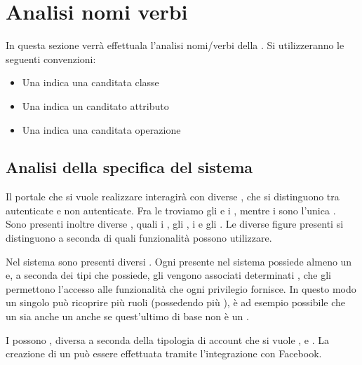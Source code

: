%


\section{Analisi nomi verbi} 
In questa sezione verrà effettuala l'analisi nomi/verbi della .
Si utilizzeranno le seguenti convenzioni:
\begin{itemize}
	\item Una  indica una canditata classe
	\item Una  indica un canditato attributo
	\item Una  indica una canditata operazione
\end{itemize}

\subsection{Analisi della specifica del sistema} 
Il portale che si vuole realizzare interagirà con diverse , che si distinguono tra autenticate e non autenticate. Fra le  troviamo gli  e i , mentre i  sono l'unica .
Sono presenti inoltre diverse , quali i , gli , i  e gli .
Le diverse figure presenti si distinguono a seconda di quali funzionalità possono utilizzare. 

\bigskip
\noindent

Nel sistema sono presenti diversi .
Ogni  presente nel sistema possiede almeno un  e, a seconda dei tipi che possiede, gli vengono associati determinati , che gli permettono l'accesso alle funzionalità che ogni privilegio fornisce. In questo modo un singolo  può ricoprire più ruoli (possedendo più ), è ad esempio possibile che un  sia anche un  anche se quest'ultimo di base non è un .

I  possono , diversa a seconda della tipologia di account che si vuole , e . La creazione di un   può essere effettuata tramite l'integrazione con Facebook.

